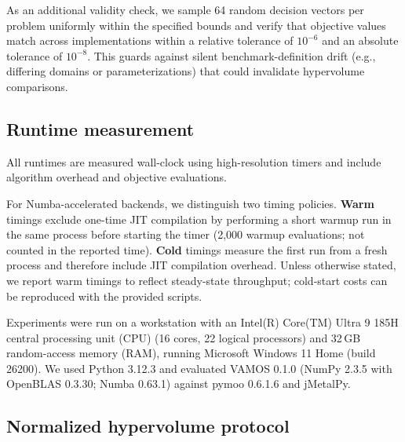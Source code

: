 \documentclass[journal]{IEEEtran}
\newcommand{\VAMOS}{VAMOS}
\begin{document}
As an additional validity check, we sample 64 random decision vectors per problem uniformly within the specified bounds and verify that objective values match across implementations within a relative tolerance of $10^{-6}$ and an absolute tolerance of $10^{-8}$. This guards against silent benchmark-definition drift (e.g., differing domains or parameterizations) that could invalidate hypervolume comparisons.

\subsection{Runtime measurement}

All runtimes are measured wall-clock using high-resolution timers and include algorithm overhead and objective evaluations.

For Numba-accelerated backends, we distinguish two timing policies. \textbf{Warm} timings exclude one-time JIT compilation by performing a short warmup run in the same process before starting the timer (2{,}000 warmup evaluations; not counted in the reported time). \textbf{Cold} timings measure the first run from a fresh process and therefore include JIT compilation overhead. Unless otherwise stated, we report warm timings to reflect steady-state throughput; cold-start costs can be reproduced with the provided scripts.

Experiments were run on a workstation with an Intel(R) Core(TM) Ultra 9 185H central processing unit (CPU) (16 cores, 22 logical processors) and 32\,GB random-access memory (RAM), running Microsoft Windows 11 Home (build 26200). We used Python 3.12.3 and evaluated \VAMOS{} 0.1.0 (NumPy 2.3.5 with OpenBLAS 0.3.30; Numba 0.63.1) against pymoo 0.6.1.6 and jMetalPy.

\subsection{Normalized hypervolume protocol}
\label{sec:hv}
\end{document}

